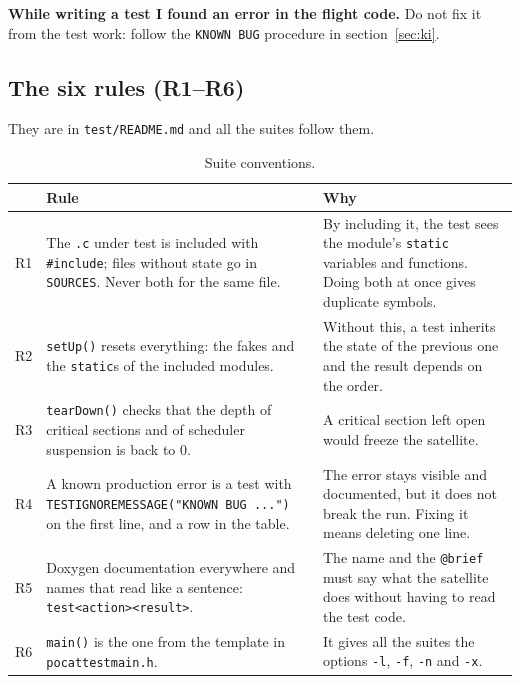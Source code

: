\documentclass[11pt,a4paper]{article}
\DeclareRobustCommand{\_}{\textunderscore\allowbreak}
\newcommand{\cd}[1]{\texttt{#1}}
\begin{document}
\textbf{While writing a test I found an error in the flight code.} Do not fix it from the
test work: follow the \cd{KNOWN BUG} procedure in section~\ref{sec:ki}.

\subsection{The six rules (R1--R6)}

They are in \cd{test/README.md} and all the suites follow them.

\begin{table}[H]
\centering\small
\begin{tabularx}{\textwidth}{@{}l>{\raggedright\arraybackslash}p{4.2cm}>{\raggedright\arraybackslash}X@{}}
\toprule
 & Rule & Why\\
\midrule
R1 & The \cd{.c} under test is included with \cd{\#include}; files without state go in \cd{SOURCES}. Never both for the same file. &
By including it, the test sees the module's \cd{static} variables and functions. Doing both at once gives duplicate symbols.\\
R2 & \cd{setUp()} resets everything: the fakes and the \cd{static}s of the included modules. &
Without this, a test inherits the state of the previous one and the result depends on the order.\\
R3 & \cd{tearDown()} checks that the depth of critical sections and of scheduler suspension is back to 0. &
A critical section left open would freeze the satellite.\\
R4 & A known production error is a test with \cd{TEST\_IGNORE\_MESSAGE("KNOWN BUG ...")} on the first line, and a row in the table. &
The error stays visible and documented, but it does not break the run. Fixing it means deleting one line.\\
R5 & Doxygen documentation everywhere and names that read like a sentence: \cd{test\_<action>\_<result>}. &
The name and the \cd{@brief} must say what the satellite does without having to read the test code.\\
R6 & \cd{main()} is the one from the template in \cd{pocat\_test\_main.h}. &
It gives all the suites the options \cd{-l}, \cd{-f}, \cd{-n} and \cd{-x}.\\
\bottomrule
\end{tabularx}
\caption{Suite conventions.}
\label{tab:rules}
\end{table}
\end{document}
